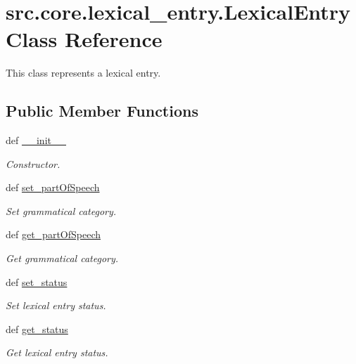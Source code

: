 \hypertarget{classsrc_1_1core_1_1lexical__entry_1_1_lexical_entry}{\section{src.\+core.\+lexical\+\_\+entry.\+Lexical\+Entry Class Reference}
\label{classsrc_1_1core_1_1lexical__entry_1_1_lexical_entry}
}


This class represents a lexical entry.  


\subsection*{Public Member Functions}
\begin{DoxyCompactItemize}
\item 
def \hyperlink{classsrc_1_1core_1_1lexical__entry_1_1_lexical_entry_ad07b137971a11c6c47b713d73453711a}{\+\_\+\+\_\+init\+\_\+\+\_\+}
\begin{DoxyCompactList}\small\item\em Constructor. \end{DoxyCompactList}\item 
def \hyperlink{classsrc_1_1core_1_1lexical__entry_1_1_lexical_entry_a8a612b39c5eebb3ee3d5deffbb3b2fda}{set\+\_\+part\+Of\+Speech}
\begin{DoxyCompactList}\small\item\em Set grammatical category. \end{DoxyCompactList}\item 
def \hyperlink{classsrc_1_1core_1_1lexical__entry_1_1_lexical_entry_ad5c7bc9ada1f19b0ca45a645d8dbab82}{get\+\_\+part\+Of\+Speech}
\begin{DoxyCompactList}\small\item\em Get grammatical category. \end{DoxyCompactList}\item 
def \hyperlink{classsrc_1_1core_1_1lexical__entry_1_1_lexical_entry_a73f06145dc2f2d50eb7c62d0604f5b69}{set\+\_\+status}
\begin{DoxyCompactList}\small\item\em Set lexical entry status. \end{DoxyCompactList}\item 
def \hyperlink{classsrc_1_1core_1_1lexical__entry_1_1_lexical_entry_a7657aabb009cb71d94f8f5abd67e2ed4}{get\+\_\+status}
\begin{DoxyCompactList}\small\item\em Get lexical entry status. \end{DoxyCompactList}\item 

\end{DoxyCompactItemize}

